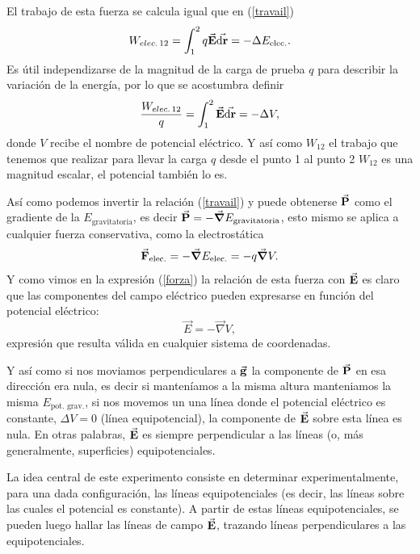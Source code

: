 \documentclass[laboratorio]{guia}
\begin{document}
El trabajo de esta fuerza se calcula igual que en (\ref{travail})
\begin{equation} 
  W_{elec.\,12}= \int_1^2 q \va{E} \va{\dd{r}}= - \Delta E_\text{elec.}.
  \label{travailElect}
\end{equation}
Es útil independizarse de la magnitud de la carga de prueba \(q\) para describir la variación de la energía, por lo que se acostumbra definir
\begin{equation} 
  \frac{W_{elec.\,12}}{q}= \int_1^2 \va{E} \va{\dd{r}}= - \Delta V,
  \label{travailElect2}
\end{equation}
donde \(V\) recibe el nombre de potencial eléctrico.
Y así como $W_{12}$ el trabajo que tenemos que realizar para llevar la carga $q$ desde el punto 1 al punto 2 $W_{12}$ es una magnitud escalar, el potencial también lo es.

Así como podemos invertir la relación (\ref{travail}) y puede obtenerse \(\va{P}\) como el gradiente de la \(E_\text{gravitatoria}\), es decir \(\va{P}= - \grad E_\text{gravitatoria}\), esto mismo se aplica a cualquier fuerza conservativa, como la electrostática
\begin{equation} 
  \va{F}_\text{elec.}= - \grad E_\text{elec.} = - q \grad V.
\end{equation}
Y como vimos en la expresión (\ref{forza}) la relación de esta fuerza con \(\va{E}\) es claro que las componentes del campo eléctrico pueden expresarse en función del potencial eléctrico:
\begin{equation}
    \vec{E} = - \vec{\nabla} V,
\end{equation}
expresión que resulta válida en cualquier sistema de coordenadas. 

Y así como si nos moviamos perpendiculares a \(\va{g}\) la componente de \(\va{P}\) en esa dirección era nula, es decir si manteníamos a la misma altura manteniamos la misma \(E_\text{pot. grav.}\), si nos movemos un una línea donde el potencial eléctrico es constante, $\Delta V=0$ (línea equipotencial), la componente de $\va{E}$ sobre esta línea es nula.
En otras palabras, $\va{E}$ es siempre perpendicular a las líneas (o, más generalmente, superficies) equipotenciales.

La idea central de este experimento consiste en determinar experimentalmente, para una dada configuración, las líneas equipotenciales (es decir, las líneas sobre las cuales el potencial es constante).
A partir de estas líneas equipotenciales, se pueden luego hallar las líneas de campo $\va{E}$, trazando líneas perpendiculares a las equipotenciales.
\end{document}
